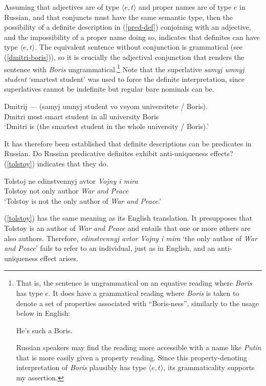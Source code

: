 \documentclass{article}
\begin{document}
Assuming that adjectives are of type $\langle e, t \rangle$ and proper names are of type $e$ in Russian, and that conjuncts must have the same semantic type, then the possibility of a definite description in (\ref{pred-def}) conjoining with an adjective, and the impossibility of a proper name doing so, indicates that definites can have type $\langle e, t \rangle$. The equivalent sentence without conjunction is grammatical (see (\ref{dmitri-boris})), so it is crucially the adjectival conjunction that renders the sentence with \textit{Boris} ungrammatical.\footnote{That is, the sentence is ungrammatical on an equative reading where \textit{Boris} has type $e$. It does have a grammatical reading where \textit{Boris} is taken to denote a set of properties associated with ``Boris-ness'', similarly to the usage below in English: \begin{exe} \ex He's such a Boris.\end{exe} Russian speakers may find the reading more accessible with a name like \textit{Putin} that is more easily given a property reading. Since this property-denoting interpretation of \textit{Boris} plausibly has type $\langle e, t \rangle$, its grammaticality supports my assertion.} Note that the superlative \textit{samyj umnyj student} `smartest student' was used to force the definite interpretation, since superlatives cannot be indefinite but regular bare nominals can be.

\begin{exe}
	\ex \label{dmitri-boris} \gll Dmitrij --- (samyj umnyj student vo vsyom universitete / Boris).\\
	Dmitri {} most smart student in all university {} Boris\\
	\glt `Dmitri is (the smartest student in the whole university / Boris).'
\end{exe}

It has therefore been established that definite descriptions can be predicates in Russian. Do Russian predicative definites exhibit anti-uniqueness effects? (\ref{tolstoy}) indicates that they do.

\begin{exe}
	\ex \label{tolstoy} \gll Tolstoj ne edinstvennyj avtor \textit{Vojny i mira}\\
	Tolstoy not only author \textit{War and Peace}\\
	\glt `Tolstoy is not the only author of \textit{War and Peace}.'
\end{exe}

(\ref{tolstoy}) has the same meaning as its English translation. It presupposes that Tolstoy is an author of \textit{War and Peace} and entails that one or more others are also authors. Therefore, \textit{edinstvennyj avtor Vojny i mira} `the only author of \textit{War and Peace}' fails to refer to an individual, just as in English, and an anti-uniqueness effect arises.
\end{document}
